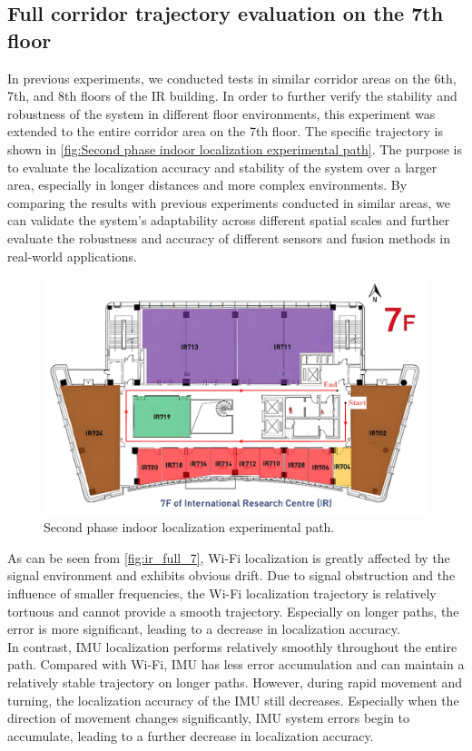 \documentclass[12pt,a4paper]{article}
\numberwithin{equation}{section}
\begin{document}
\subsection{Full corridor trajectory evaluation on the 7th floor}
\noindent In previous experiments, we conducted tests in similar corridor areas on the 6th, 7th, and 8th floors of the IR building. In order to further verify the stability and robustness of the system in different floor environments, this experiment was extended to the entire corridor area on the 7th floor. The specific trajectory is shown in \autoref{fig:Second phase indoor localization experimental path}. The purpose is to evaluate the localization accuracy and stability of the system over a larger area, especially in longer distances and more complex environments. By comparing the results with previous experiments conducted in similar areas, we can validate the system's adaptability across different spatial scales and further evaluate the robustness and accuracy of different sensors and fusion methods in real-world applications.
\begin{figure}[H]
    \centering
    \includegraphics[width=0.9\linewidth]{images/ir_full_circle.png}
    \caption{Second phase indoor localization experimental path.}
    \label{fig:Second phase indoor localization experimental path}
\end{figure}
\noindent As can be seen from \autoref{fig:ir_full_7}, Wi-Fi localization is greatly affected by the signal environment and exhibits obvious drift. Due to signal obstruction and the influence of smaller frequencies, the Wi-Fi localization trajectory is relatively tortuous and cannot provide a smooth trajectory. Especially on longer paths, the error is more significant, leading to a decrease in localization accuracy.\\
In contrast, IMU localization performs relatively smoothly throughout the entire path. Compared with Wi-Fi, IMU has less error accumulation and can maintain a relatively stable trajectory on longer paths. However, during rapid movement and turning, the localization accuracy of the IMU still decreases. Especially when the direction of movement changes significantly, IMU system errors begin to accumulate, leading to a further decrease in localization accuracy.\\
\end{document}
